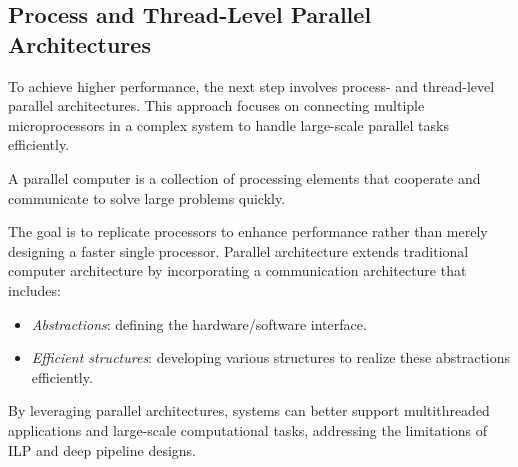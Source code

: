 \subsection{Process and Thread-Level Parallel Architectures}
To achieve higher performance, the next step involves process- and thread-level parallel architectures. 
This approach focuses on connecting multiple microprocessors in a complex system to handle large-scale parallel tasks efficiently.
\begin{definition}
    A parallel computer is a collection of processing elements that cooperate and communicate to solve large problems quickly.
\end{definition}
The goal is to replicate processors to enhance performance rather than merely designing a faster single processor. 
Parallel architecture extends traditional computer architecture by incorporating a communication architecture that includes:
\begin{itemize}
    \item \textit{Abstractions}: defining the hardware/software interface.
    \item \textit{Efficient structures}: developing various structures to realize these abstractions efficiently.
\end{itemize}
By leveraging parallel architectures, systems can better support multithreaded applications and large-scale computational tasks, addressing the limitations of ILP and deep pipeline designs.
